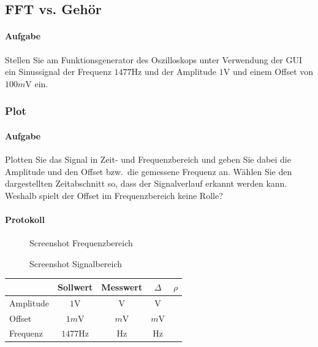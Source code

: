\documentclass[10pt]{report}
\begin{document}

        \subsection{FFT vs. Gehör}
        \paragraph{Aufgabe}
        Stellen Sie am Funktionsgenerator des Oszilloskops unter Verwendung der GUI ein Sinussignal
        der Frequenz $1477\si{\hertz}$ und der Amplitude $1\si{\volt}$ und einem Offset von $100\si{m\volt}$
        ein.

        \subsubsection{Plot}
        \paragraph{Aufgabe}
        Plotten Sie das Signal in Zeit- und Frequenzbereich und geben Sie dabei die Amplitude
        und den Offset bzw.\ die gemessene Frequenz an. Wählen Sie den dargestellten
        Zeitabschnitt so, dass der Signalverlauf erkannt werden kann. Weshalb spielt der
        Offset im Frequenzbereich keine Rolle?
        \paragraph{Protokoll}
        \begin{center}
            \begin{figure}[H]
              \caption{Screenshot Frequenzbereich}
            \end{figure}
            \begin{figure}[H]
              \caption{Screenshot  Signalbereich}
            \end{figure}
            \begin{tabular}{lcccc}
                \toprule
                & Sollwert & Messwert & $\Delta$ & $\rho$\\
                \midrule
                Amplitude & $1\si{\volt}$ & $\si{\volt}$ & $\si{\volt}$ & \\
                Offset & $1\si{m\volt}$ & $\si{m\volt}$ & $\si{m\volt}$ & \\
                Frequenz & $1477\si{\hertz}$ & $\si{\hertz}$ & $\si{\hertz}$ & \\
                \bottomrule
            \end{tabular}
        \end{center}
\end{document}
